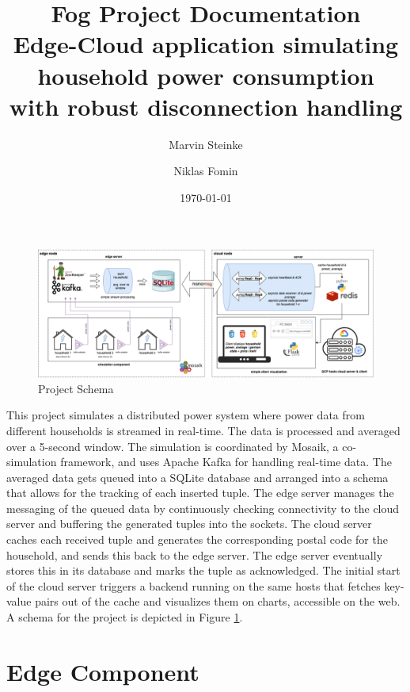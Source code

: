\documentclass[a4paper]{article}
\title{%
    Fog Project Documentation\\[5mm]
    {\normalsize Edge-Cloud application simulating household power
    consumption\\[-2mm] with robust disconnection handling}
}
\author{Marvin Steinke \and Niklas Fomin}
\date{\today}
\begin{document}
\maketitle

\begin{figure}
    \centering
    \includegraphics[width=\linewidth]{../schema/schema}
    \caption{Project Schema}
    \label{fig:project_schema}
\end{figure}

This project simulates a distributed power system where power data from
different households is streamed in real-time. The data is processed and
averaged over a 5-second window. The simulation is coordinated by Mosaik, a
co-simulation framework, and uses Apache Kafka for handling real-time data. The
averaged data gets queued into a SQLite database and arranged into a schema
that allows for the tracking of each inserted tuple. The edge server manages the
messaging of the queued data by continuously checking connectivity to the cloud
server and buffering the generated tuples into the sockets. The cloud server
caches each received tuple and generates the corresponding postal code for the
household, and sends this back to the edge server. The edge server eventually
stores this in its database and marks the tuple as acknowledged. The initial
start of the cloud server triggers a backend running on the same hosts that
fetches key-value pairs out of the cache and visualizes them on charts,
accessible on the web. A schema for the project is depicted in Figure
\ref{fig:project_schema}.

\section{Edge Component}
\end{document}
